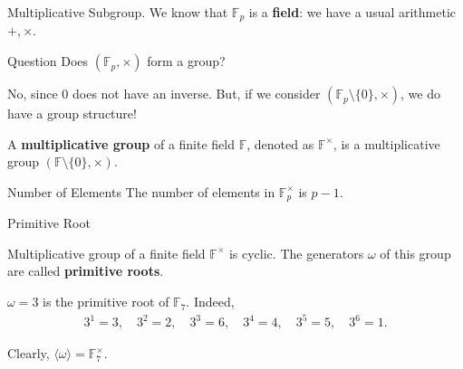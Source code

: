 \documentclass{zkdl-presentation-template}
\begin{document}
    \begin{frame}{Multiplicative Subgroup.}
        We know that $\mathbb{F}_p$ is a \textbf{field}: we have a usual arithmetic $+,\times$.

        \begin{alertblock}{Question}
            Does $(\mathbb{F}_p, \times)$ form a group?
        \end{alertblock}

        No, since $0$ does not have an inverse. But, if we consider
        $(\mathbb{F}_p \setminus \{0\}, \times)$, we do have a group structure!

        \begin{definition}
            A \textbf{multiplicative group} of a finite field $\mathbb{F}$, denoted as $\mathbb{F}^{\times}$, is a multiplicative group $(\mathbb{F} \setminus \{0\}, \times)$.
        \end{definition}

        \begin{block}{Number of Elements}
            The number of elements in $\mathbb{F}^{\times}_p$ is $p - 1$.
        \end{block}
    \end{frame}

    \begin{frame}{Primitive Root}
        \begin{theorem}
            Multiplicative group of a finite field $\mathbb{F}^{\times}$ is cyclic. The generators $\omega$ of 
            this group are called \textbf{primitive roots}.
        \end{theorem}

        \begin{example}
            $\omega=3$ is the primitive root of $\mathbb{F}_7$. Indeed,
            \begin{align*}
                3^1 = 3, \quad 3^2 = 2, \quad 3^3 = 6, \quad 3^4 = 4, \quad 3^5 = 5, \quad 3^6 = 1.
            \end{align*} 

            Clearly, $\langle \omega \rangle = \mathbb{F}_7^{\times}$.
        \end{example}
    \end{frame}
\end{document}
